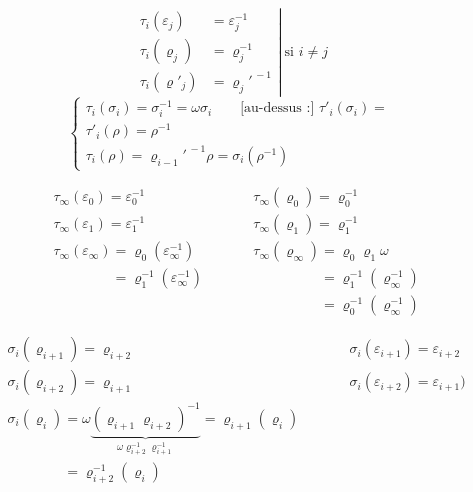 \documentclass[11pt,a4paper]{article}
\begin{document}
\[
\left.
\begin{aligned}
\tau_i(\varepsilon_j) &= \varepsilon_j^{-1} \\
\tau_i(\varrho_j) &= \varrho_j^{-1} \\
\tau_i(\varrho'_j) &= \varrho_j'^{\,-1}
\end{aligned}
\right| \ \text{si } i \neq j
\]
\[
\begin{cases}
\tau_i(\sigma_i) = \sigma_i^{-1} = \omega\sigma_i \qquad \text{[au-dessus :] } \tau'_i(\sigma_i) = \\
\tau'_i(\rho) = \rho^{-1} \\
\tau_i(\rho) = \varrho_{i-1}'^{\,-1}\rho = \sigma_i(\rho^{-1})
\end{cases}
\]

\struck{\ill{}}
\[
\begin{aligned}
&\tau_\infty(\varepsilon_0) = \varepsilon_0^{-1} &\qquad& \tau_\infty(\varrho_0) = \varrho_0^{-1} \\
&\tau_\infty(\varepsilon_1) = \varepsilon_1^{-1} && \tau_\infty(\varrho_1) = \varrho_1^{-1} \\
&\tau_\infty(\varepsilon_\infty) = \varrho_0(\varepsilon_\infty^{-1}) && \tau_\infty(\varrho_\infty) = \varrho_0\varrho_1\omega \\
&\phantom{\tau_\infty(\varepsilon_\infty)} = \varrho_1^{-1}(\varepsilon_\infty^{-1}) && \phantom{\tau_\infty(\varrho_\infty)} = \varrho_1^{-1}(\varrho_\infty^{-1}) \\
& && \phantom{\tau_\infty(\varrho_\infty)} = \varrho_0^{-1}(\varrho_\infty^{-1})
\end{aligned}
\]

\[
\begin{aligned}
&\sigma_i(\varrho_{i+1}) = \varrho_{i+2} &\qquad& \sigma_i(\varepsilon_{i+1}) = \varepsilon_{i+2} \\
&\sigma_i(\varrho_{i+2}) = \varrho_{i+1} && \sigma_i(\varepsilon_{i+2}) = \varepsilon_{i+1}) \\
&\sigma_i(\varrho_i) = \omega\underbrace{(\varrho_{i+1}\varrho_{i+2})^{-1}}_{\omega\varrho_{i+2}^{-1}\varrho_{i+1}^{-1}} = \varrho_{i+1}(\varrho_i) && \\
& \phantom{\sigma_i(\varrho_i)} = \varrho_{i+2}^{-1}(\varrho_i) &&
\end{aligned}
\]
\end{document}
